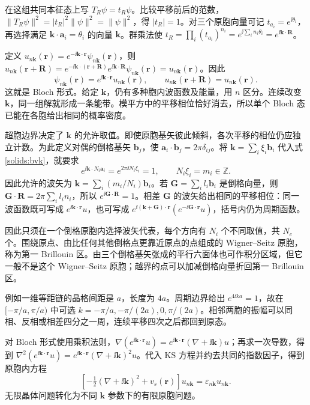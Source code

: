 在这组共同本征态上写 $T_R\psi=t_R\psi$。比较平移前后的范数，$\|T_R\psi\|^2=|t_R|^2\|\psi\|^2=\|\psi\|^2$，得 $|t_R|=1$。对三个原胞向量可记 $t_{a_i}=e^{\ii\theta_i}$，再选择满足 $\bm k\cdot\bm a_i=\theta_i$ 的向量 $\bm k$。群乘法使 $t_R=\prod_i(t_{a_i})^{n_i}=e^{\ii\sum_i n_i\theta_i}=e^{\ii\bm k\cdot\bm R}$。

定义 $u_{n\bm k}(\bm r)=e^{-\ii\bm k\cdot\bm r}\psi_{n\bm k}(\bm r)$，则 $u_{n\bm k}(\bm r+\bm R)=e^{-\ii\bm k\cdot(\bm r+\bm R)}e^{\ii\bm k\cdot\bm R}\psi_{n\bm k}(\bm r)=u_{n\bm k}(\bm r)$。因此
\begin{equation}\label{solids:bloch}
\psi_{n\bm k}(\bm r)=e^{\ii\bm k\cdot\bm r}u_{n\bm k}(\bm r),\qquad u_{n\bm k}(\bm r+\bm R)=u_{n\bm k}(\bm r).
\end{equation}
这就是 Bloch 形式。给定 $\bm k$，仍有多种胞内波函数及能量，用 $n$ 区分。连续改变 $\bm k$，同一组解就形成一条能带。模平方中的平移相位恰好消去，所以单个 Bloch 态已能在各胞给出相同的概率密度。

超胞边界决定了 $\bm k$ 的允许取值。即使原胞基矢彼此倾斜，各次平移的相位仍应独立计数。为此定义对偶的倒格基矢 $\bm b_j$，使 $\bm a_i\cdot\bm b_j=2\pi\delta_{ij}$。将 $\bm k=\sum_i\xi_i\bm b_i$ 代入式\eqref{solids:bvk}，就要求
\begin{equation}
e^{\ii\bm k\cdot N_i\bm a_i}=e^{2\pi\ii N_i\xi_i}=1,
\qquad N_i\xi_i=m_i\in\mathbb Z.
\end{equation}
因此允许的波矢为 $\bm k=\sum_i(m_i/N_i)\bm b_i$。若 $\bm G=\sum_i l_i\bm b_i$ 是倒格向量，则 $\bm G\cdot\bm R=2\pi\sum_i l_in_i$，所以 $e^{\ii\bm G\cdot\bm R}=1$。相差 $\bm G$ 的波矢给出相同的平移相位：同一波函数既可写成 $e^{\ii\bm k\cdot\bm r}u$，也可写成 $e^{\ii(\bm k+\bm G)\cdot\bm r}(e^{-\ii\bm G\cdot\bm r}u)$，括号内仍为周期函数。

因此只须在一个倒格原胞内选择波矢代表，每个方向有 $N_i$ 个不同取值，共 $N_c$ 个。围绕原点、由比任何其他倒格点更靠近原点的点组成的 Wigner--Seitz 原胞，称为第一 Brillouin 区。由三个倒格基矢张成的平行六面体也可作积分区域，但它一般不是这个 Wigner--Seitz 原胞；越界的点可以加减倒格向量折回第一 Brillouin 区。

例如一维等距链的晶格间距是 $a$，长度为 $4a$。周期边界给出 $e^{4\ii ka}=1$，故在 $[-\pi/a,\pi/a)$ 中可选 $k=-\pi/a,-\pi/(2a),0,\pi/(2a)$。相邻两胞的振幅可以同相、反相或相差四分之一周，连续平移四次之后都回到原态。

对 Bloch 形式使用乘积法则，$\nabla(e^{\ii\bm k\cdot\bm r}u)=e^{\ii\bm k\cdot\bm r}(\nabla+\ii\bm k)u$；再求一次导数，得到 $\nabla^2(e^{\ii\bm k\cdot\bm r}u)=e^{\ii\bm k\cdot\bm r}(\nabla+\ii\bm k)^2u$。代入 KS 方程并约去共同的指数因子，得到原胞内方程
\begin{equation}\label{solids:cell-ks}
\left[-\tfrac12(\nabla+\ii\bm k)^2+v_s(\bm r)\right]u_{n\bm k}=\varepsilon_{n\bm k}u_{n\bm k}.
\end{equation}
无限晶体问题转化为不同 $\bm k$ 参数下的有限原胞问题。

